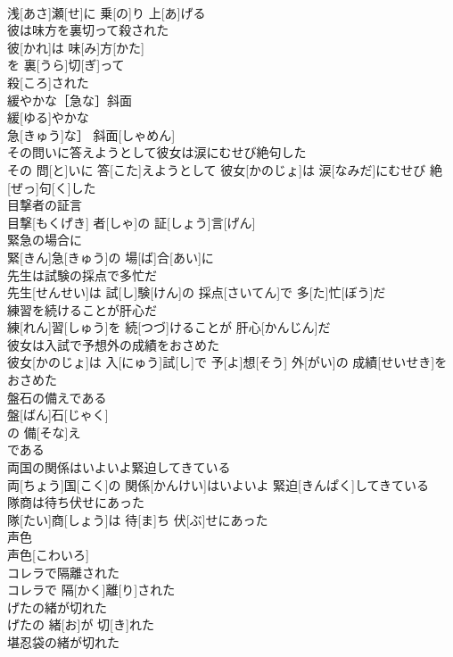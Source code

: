 \documentclass[8pt]{extreport}
\begin{document}
\begin{CJK}{UTF8}{min}
\\	浅[あさ]瀬[せ]に 乗[の]り 上[あ]げる
\\	彼は味方を裏切って殺された	
\\	彼[かれ]は 味[み]方[かた]
\\	を 裏[うら]切[ぎ]って 
\\	殺[ころ]された 
\\	緩やかな［急な］斜面	
\\	緩[ゆる]やかな
\\	急[きゅう]な］ 斜面[しゃめん]
\\	その問いに答えようとして彼女は涙にむせび絶句した	
\\	その 問[と]いに 答[こた]えようとして 彼女[かのじょ]は 涙[なみだ]にむせび 絶[ぜっ]句[く]した
\\	目撃者の証言	
\\	目撃[もくげき] 者[しゃ]の 証[しょう]言[げん]
\\	緊急の場合に	
\\	緊[きん]急[きゅう]の 場[ば]合[あい]に
\\	先生は試験の採点で多忙だ	
\\	先生[せんせい]は 試[し]験[けん]の 採点[さいてん]で 多[た]忙[ぼう]だ
\\	練習を続けることが肝心だ	
\\	練[れん]習[しゅう]を 続[つづ]けることが 肝心[かんじん]だ
\\	彼女は入試で予想外の成績をおさめた	
\\	彼女[かのじょ]は 入[にゅう]試[し]で 予[よ]想[そう] 外[がい]の 成績[せいせき]をおさめた
\\	盤石の備えである	
\\	盤[ばん]石[じゃく]
\\	の 備[そな]え 
\\	である
\\	両国の関係はいよいよ緊迫してきている	
\\	両[ちょう]国[こく]の 関係[かんけい]はいよいよ 緊迫[きんぱく]してきている
\\	隊商は待ち伏せにあった	
\\	隊[たい]商[しょう]は 待[ま]ち 伏[ぶ]せにあった
\\	声色	
\\	声色[こわいろ]
\\	コレラで隔離された	
\\	コレラで 隔[かく]離[り]された
\\	げたの緒が切れた	
\\	げたの 緒[お]が 切[き]れた
\\	堪忍袋の緒が切れた	

\end{CJK}
\end{document}
